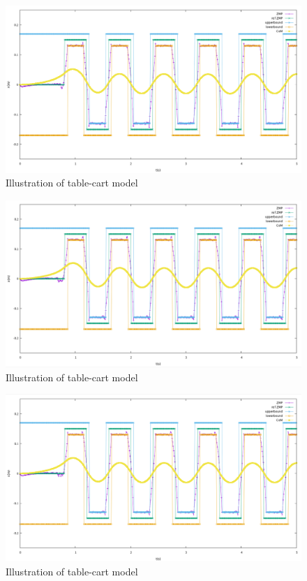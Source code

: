 \begin{figure}[H]
  \centering
 \includegraphics[keepaspectratio, scale=0.25]
      {images/mpc_horizon/mpc_horizon_200.png}
 \caption{Illustration of table-cart model}
 \label{Fig:Illustration of table-cart model}
\end{figure}

\begin{figure}[H]
  \centering
 \includegraphics[keepaspectratio, scale=0.25]
      {images/mpc_horizon/mpc_horizon_250.png}
 \caption{Illustration of table-cart model}
 \label{Fig:Illustration of table-cart model}
\end{figure}

\begin{figure}[H]
  \centering
 \includegraphics[keepaspectratio, scale=0.25]
      {images/mpc_horizon/mpc_horizon_300.png}
 \caption{Illustration of table-cart model}
 \label{Fig:Illustration of table-cart model}
\end{figure}

